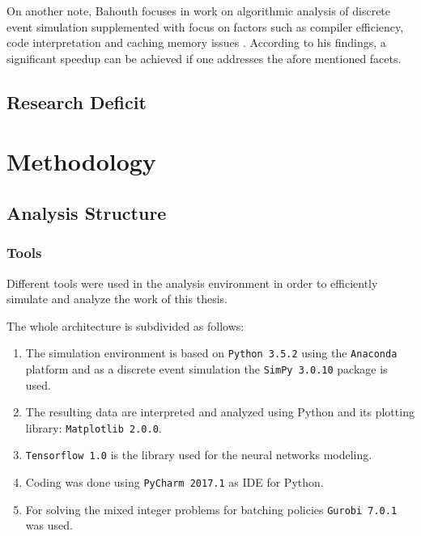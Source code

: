 \documentclass{seal_thesis}
\begin{document}
On another note, Bahouth focuses in work on algorithmic analysis of discrete event simulation supplemented with focus on factors such as compiler efficiency, code interpretation and caching memory issues \cite{Bahouth2007}. According to his findings, a significant speedup can be achieved if one addresses the afore mentioned facets.

\section{Research Deficit}

\chapter{Methodology}
\label{ch:methodology}

\section{Analysis Structure}
\subsection{Tools}
Different tools were used in the analysis environment in order to efficiently simulate and analyze the work of this thesis.

The whole architecture is subdivided as follows:
\begin{enumerate}
	\item The simulation environment is based on \texttt{Python 3.5.2} using the \texttt{Anaconda} platform and as a discrete event simulation the \texttt{SimPy 3.0.10} package is used.
	\item The resulting data are interpreted and analyzed using Python and its plotting library: \texttt{Matplotlib 2.0.0}.
	\item \texttt{Tensorflow 1.0} is the library used for the neural networks modeling.
	\item Coding was done using \texttt{PyCharm 2017.1} as IDE for Python.
	\item For solving the mixed integer problems for batching policies \texttt{Gurobi 7.0.1} was used.
\end{enumerate}
\end{document}
